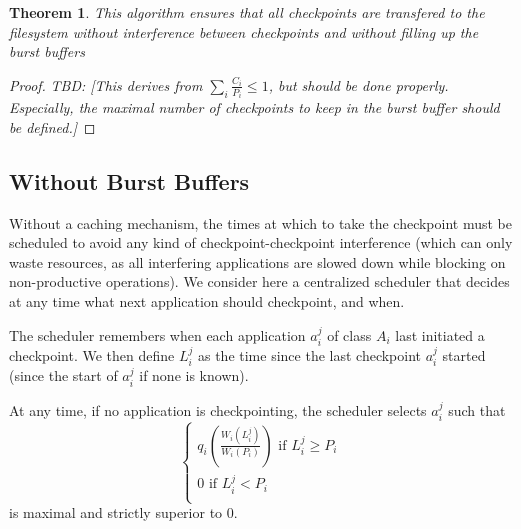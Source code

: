 \documentclass{article}
\newtheorem{theorem}{Theorem}
\newcommand{\app}[1]{A_{#1}}
\newcommand{\application}[2]{a_{#1}^{#2}}
\newcommand{\nbnodes}[1]{q_{#1}}
\newcommand{\period}[1]{P_{#1}}
\newcommand{\ckpt}[1]{C_{#1}}
\newcommand{\lastckpt}[2]{L_{#1}^{#2}}
\newcommand{\wastefct}[2]{W_{#1}(#2)}
\newcommand{\todo}[1]{\textit{TBD: [#1]}}
\begin{document}
\begin{theorem}
This algorithm ensures that all checkpoints are transfered to the
filesystem without interference between checkpoints and without
filling up the burst buffers
\end{theorem}

\begin{proof}
  \todo{This derives from $\sum_i \frac{\ckpt{i}}{\period{i}} \leq 1$,
    but should be done properly. Especially, the maximal number of
    checkpoints to keep in the burst buffer should be defined.}
\end{proof}

\subsection{Without Burst Buffers}

Without a caching mechanism, the times at which to take the checkpoint
must be scheduled to avoid any kind of checkpoint-checkpoint
interference (which can only waste resources, as all interfering
applications are slowed down while blocking on non-productive
operations). We consider here a centralized scheduler that decides at
any time what next application should checkpoint, and when.

The scheduler remembers when each application $\application{i}{j}$ of class
$\app{i}$ last initiated a checkpoint. We then define $\lastckpt{i}{j}$
as the time since the last checkpoint $\application{i}{j}$ started
(since the start of $\application{i}{j}$ if none is known). 

At any time, if no application is checkpointing, the scheduler selects
$\application{i}{j}$ such that 
$$
\left\{
\begin{array}{l}
\nbnodes{i}(\frac{\wastefct{i}{\lastckpt{i}{j}}}{\wastefct{i}{\period{i}}}) \textrm{ if }\lastckpt{i}{j}\geq\period{i}\\
0\textrm{ if }\lastckpt{i}{j}<\period{i}\\
\end{array}\right.$$
is maximal and strictly superior to 0.
\end{document}
